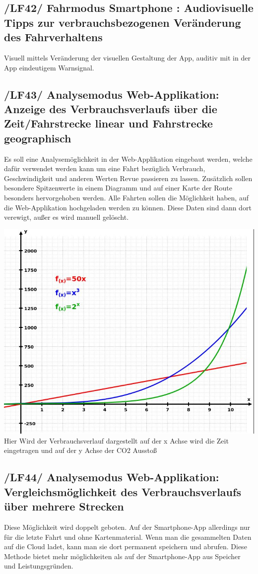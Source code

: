 \subsection{/LF42/ Fahrmodus Smartphone : Audiovisuelle Tipps zur verbrauchsbezogenen Veränderung des Fahrverhaltens}
\nextline
Visuell mittels Veränderung der visuellen Gestaltung der App, auditiv mit in der App eindeutigem Warnsignal.

\subsection{/LF43/ Analysemodus Web-Applikation: Anzeige des Verbrauchsverlaufs über die Zeit/Fahrstrecke linear und Fahrstrecke geographisch}
\nextline
Es soll eine Analysemöglichkeit in der Web-Applikation eingebaut werden, 
welche dafür verwendet werden kann um eine Fahrt bezüglich Verbrauch, 
Geschwindigkeit und anderen Werten Revue passieren zu lassen.
 Zusätzlich sollen besondere Spitzenwerte in einem Diagramm und auf einer Karte der Route besonders hervorgehoben werden. 
Alle Fahrten sollen die Möglichkeit haben, auf die Web-Applikation hochgeladen werden zu können. Diese Daten sind dann dort
verewigt, außer es wird manuell gelöscht.

\includegraphics[scale=0.7]{images/LF43_Diagramm.jpg}
\nextline
Hier Wird der Verbrauchsverlauf dargestellt auf der x Achse wird die Zeit eingetragen und auf der y Achse der CO2 Ausstoß

\subsection{/LF44/ Analysemodus Web-Applikation: Vergleichsmöglichkeit des Verbrauchsverlaufs über mehrere Strecken}
\nextline
Diese Möglichkeit wird doppelt geboten. Auf der Smartphone-App allerdings nur für die letzte Fahrt und ohne Kartenmaterial.
Wenn man die gesammelten Daten auf die Cloud ladet, kann man sie dort permanent speichern und abrufen.
Diese Methode bietet mehr möglichkeiten als auf der Smartphone-App aus Speicher und Leistungsgründen.


